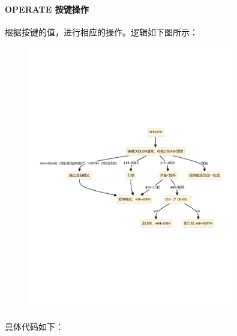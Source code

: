 \documentclass{article}
\begin{document}
\paragraph*{OPERATE 按键操作}  
根据按键的值，进行相应的操作。逻辑如下图所示：
\begin{figure}[H]
    \centering
    \includegraphics[width=0.8\textwidth]{assets/time0.pdf}
\end{figure}
具体代码如下：
\end{document}
